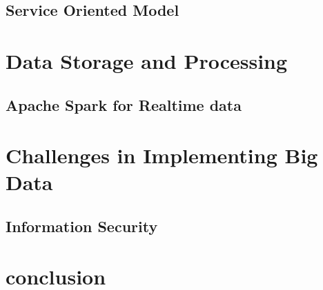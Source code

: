 \documentclass[sigconf]{acmart}
\begin{document}
\subsection{Service Oriented Model}

 

\section{Data Storage and Processing}
 

\subsection{Apache Spark for Realtime data}


\section{Challenges in Implementing Big Data}
\subsection{Information Security}

\section{conclusion}




 
\end{document}
